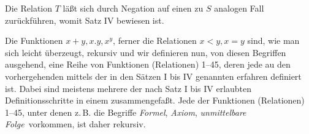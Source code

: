 \documentclass[draft]{scrartcl}
\begin{document}
Die Relation $T$ läßt sich durch Negation auf einen zu
$S$ analogen Fall zurückführen, womit Satz IV bewiesen
ist.

Die Funktionen $x + y, x.y, x^y$, ferner die Relationen
$x < y, x = y$ sind, wie man sich leicht überzeugt,
rekursiv und wir definieren nun, von diesen Begriffen
ausgehend, eine Reihe von Funktionen (Relationen) 1--45,
deren jede au den vorhergehenden mittels der in den Sätzen 
I bis IV genannten erfahren definiert ist. Dabei sind
meistens mehrere der nach Satz I bis IV erlaubten 
Definitionsschritte in einem zusammengefaßt. Jede der 
Funktionen (Relationen) 1--45, unter denen z.\,B. die
Begriffe \glqq\textit{Formel}\grqq, \glqq\textit{Axiom}\grqq, \glqq\textit{unmittelbare Folge}\grqq\ vorkommen, 
ist daher rekursiv.
\end{document}

